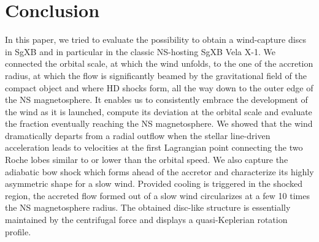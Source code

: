 \documentclass{aa}
\makeatletter
\newcommand{\sgx}{SgXB\xspace}
\newcommand*{\ns}{NS\@\xspace}
\makeatother
\begin{document}
%
%

\section{Conclusion}
\label{sec:conc}

In this paper, we tried to evaluate the possibility to obtain a wind-capture discs in \sgx and in particular in the classic \ns -hosting \sgx Vela X-1. We connected the orbital scale, at which the wind unfolds, to the one of the accretion radius, at which the flow is significantly beamed by the gravitational field of the compact object and where HD shocks form, all the way down to the outer edge of the \ns magnetosphere. It enables us to consistently embrace the development of the wind as it is launched, compute its deviation at the orbital scale and evaluate the fraction eventually reaching the \ns magnetosphere. We showed that the wind dramatically departs from a radial outflow when the stellar line-driven acceleration leads to velocities at the first Lagrangian point connecting the two Roche lobes similar to or lower than the orbital speed. We also capture the adiabatic bow shock which forms ahead of the accretor and characterize its highly asymmetric shape for a slow wind. Provided cooling is triggered in the shocked region, the accreted flow formed out of a slow wind circularizes at a few 10 times the \ns magnetosphere radius. The obtained disc-like structure is essentially maintained by the centrifugal force and displays a quasi-Keplerian rotation profile.
\end{document}
